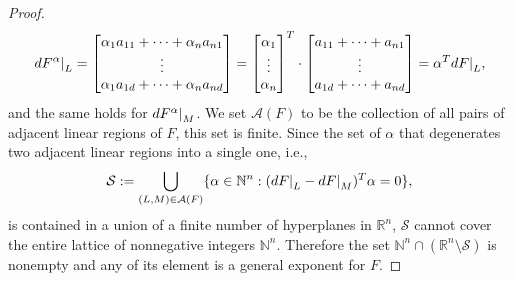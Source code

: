 \documentclass{article}
\theoremstyle{definition}
\newcommand\restr[2]{{%
  \left.\kern-\nulldelimiterspace %
  #1 %
  \right|_{#2} %
  }}
\begin{document}
\begin{proof}
$$d\restr{F^{\alpha}}{L} = \begin{bmatrix}
\alpha_1 a_{11} + \dots + \alpha_n a_{n1} \\
\vdots \\
\alpha_1 a_{1d} + \dots + \alpha_n a_{nd}
\end{bmatrix} = \begin{bmatrix}
\alpha_1 \\
\vdots \\
\alpha_n
\end{bmatrix}^{T}
\cdot \begin{bmatrix}
 a_{11} + \dots + a_{n1} \\
\vdots \\
a_{1d} + \dots + a_{nd}
\end{bmatrix}
= \alpha^{T}d\restr{F}{L},$$
and the same holds for $d\restr{F^{\alpha}}{M}$. We set $\mathcal{A}(F)$ to be the collection of all pairs of adjacent linear regions of $F$, this set is finite. Since the set of $\alpha$ that degenerates two adjacent linear regions into a single one, i.e.,
$$\mathcal{S} := \displaystyle\bigcup_{(L,M) \in \mathcal{A}(F)}\{\alpha \in \mathbb{N}^{n} : (d\restr{F}{L} - d\restr{F}{M})^{T}\alpha=0\},$$
is contained in a union of a finite number of hyperplanes in $\mathbb{R}^{n}$, $\mathcal{S}$ cannot cover the entire lattice of nonnegative integers $\mathbb{N}^{n}$.
Therefore the set $\mathbb{N}^{n} \cap (\mathbb{R}^{n} \setminus \mathcal{S})$ is nonempty and any of its element is a general exponent for $F$.
\end{proof}
\end{document}
